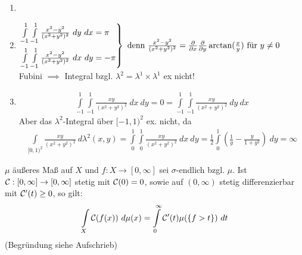   \begin{example}
    \begin{enumerate}
      \item[]
      \item 
          $\begin{rcases}
            \int\limits_{-1}^1 \int\limits_{-1}^1 \frac{x^2-y^2}{(x^2+y^2)^2} \ dy \ dx = \pi\\
            \int\limits_{-1}^1 \int\limits_{-1}^1 \frac{x^2-y^2}{(x^2+y^2)^2} \ dx \ dy = -\pi
          \end{rcases} \text{ denn } \frac{x^2-y^2}{(x^2+y^2)^2} = \frac{\partial}{\partial x} \frac{\partial}{\partial y} \arctan(\frac{x}{y}) \text{ für } y \neq 0$\\
          Fubini $\implies$ Integral bzgl. $\lambda^2 = \lambda^1 \times \lambda^1$ ex nicht!
      \item
        \begin{align*}
          \int\limits_{-1}^1 \int\limits_{-1}^1 \frac{xy}{(x^2+y^2)^2} \ dx \ dy = 0 = \int\limits_{-1}^1 \int\limits_{-1}^1 \frac{xy}{(x^2+y^2)^2} \ dy \ dx
        \end{align*}
        Aber das $\lambda^2$-Integral über $[-1,1)^2$ ex. nicht, da
        \begin{align*}
          \int\limits_{[0,1)^2} \frac{xy}{(x^2+y^2)^2} \ d\lambda^2(x,y) = \int\limits_0^1 \int\limits_0^1 \frac{xy}{(x^2+y^2)^2} \ dx \ dy = \frac{1}{2} \int\limits_0^1 (\frac{1}{y} - \frac{y}{1+y^2}) \ dy = \infty
        \end{align*}
    \end{enumerate}
  \end{example}

  \begin{example}
    $\mu$ äußeres Maß auf $X$ und $f: X \to [0, \infty]$ sei $\sigma$-endlich bzgl. $\mu$. Ist $\mathcal{C}:[0,\infty] \to [0, \infty]$ stetig mit $\mathcal{C}(0) = 0$, sowie auf $(0, \infty)$ stetig differenzierbar mit $\mathcal{C}'(t)\geq0$, so gilt:
    \begin{align*}
      \int\limits_X \mathcal{C}(f(x)) \ d\mu(x) = \int\limits_0^{\infty} \mathcal{C}'(t) \mu(\{f > t\}) \ dt
    \end{align*}
    (Begründung siehe Aufschrieb)
  \end{example}